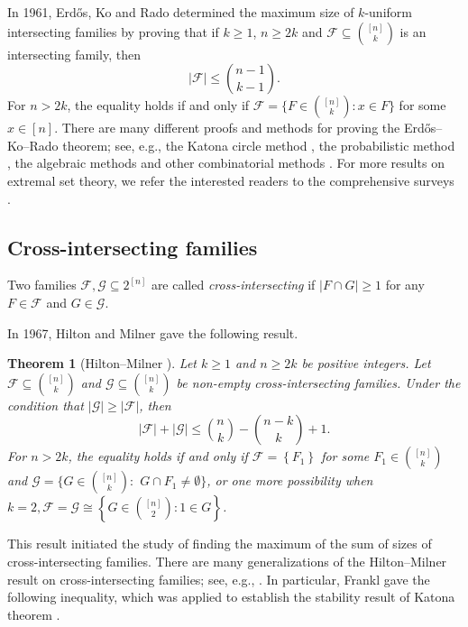\documentclass[11pt]{article}
\numberwithin{equation}{section}
\newtheorem{theorem}{Theorem}[section]
\begin{document}
In 1961, Erd\H{o}s, Ko and Rado \cite{E61} determined the maximum size of $k$-uniform
intersecting families by proving that if $k\ge 1$, $n\ge 2k$ and 
 $\mathcal{F} \subseteq\binom{[n]}{k}$ is an intersecting family, then 
\begin{equation*} \label{eq-EKR-bound}
|\mathcal{F}|\leq\binom{n-1}{k-1}.
\end{equation*}
For $n > 2 k$, the equality holds if and only if $\mathcal{F}=\big\{F\in \binom{[n]}{k}: x\in F\big\}$ for some $x \in [n]$. 
There are many different proofs and methods for proving the Erd\H{o}s--Ko--Rado theorem; see, e.g., the Katona  circle method \cite{Kat1972},  the probabilistic method \cite{AS2016}, the algebraic methods \cite{Fur2006,HZ2017,Lov1979} and other combinatorial methods \cite{Day1974b,FF2012,H18,K64,KZ2018}.  
 For more results on extremal set theory, we refer the interested readers to the  comprehensive surveys \cite{FT16,Ellis2021}. 

 

\subsection{Cross-intersecting families}

Two families  $\mathcal{F},\mathcal{G}\subseteq 2^{[n]}$ are  called \textit{cross-intersecting} if $|F\cap G|\geq 1$
 for any $F\in \mathcal{F}$ and $G\in \mathcal{G}$.

In 1967, Hilton and Milner \cite{H67} gave the following result. 

\begin{theorem}[Hilton--Milner \cite{H67}]  \label{mainH}
Let $k \geq 1$ and $n \geq 2 k$ be positive integers.  Let $\mathcal{F} \subseteq\binom{[n]}{k}$ and $\mathcal{G} \subseteq\binom{[n]}{k}$ be  non-empty cross-intersecting families. Under the condition that $|\mathcal{G}| \geq |\mathcal{F}|$, then
$$
|\mathcal{F}|+|\mathcal{G}| \leq\binom{n}{k}-\binom{n-k}{k}+1.
$$
For $n > 2 k$, the equality holds if and only if $\mathcal{F}=\left\{F_1\right\}$ for some $F_1 \in\binom{[n]}{k}$ and $\mathcal{G}= \big\{G \in\binom{[n]}{k}:$ $ G \cap F_1 \neq \emptyset \big\}$, or one more possibility when $k=2, \mathcal{F}=\mathcal{G}\cong\left\{G \in\binom{[n]}{2}: 1\in G\right\}$.
\end{theorem}

This result initiated the study of finding the maximum of the sum of sizes of cross-intersecting families. 
There are many generalizations of the Hilton--Milner result on cross-intersecting families; see, e.g.,  \cite{F16,F24,FT92,F98,FW2024-EUJC,GXZ2024,SFQ2022,WZ2013}. 
In particular, Frankl \cite{F16} gave the following inequality, which was applied to establish the stability result of Katona theorem \cite{K64}.
\end{document}
